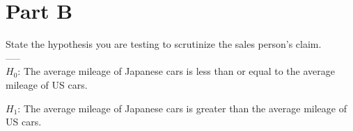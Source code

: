 \section{Part B}
State the hypothesis you are testing to scrutinize the sales person's claim.\\
-----\\

$ H_0 $: The average mileage of Japanese cars is less than or equal to the average mileage of US cars.

$ H_1 $: The average mileage of Japanese cars is greater than the average mileage of US cars.

\newpage
